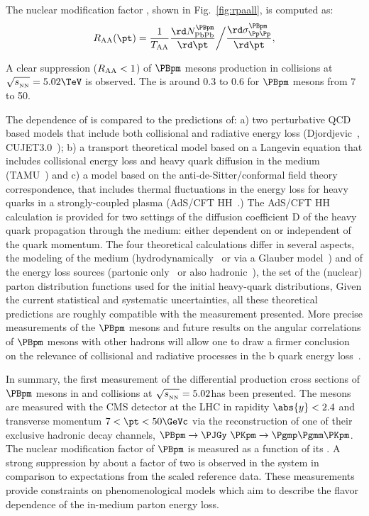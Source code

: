 The nuclear modification factor \RAA, shown in Fig.~\ref{fig:rpaall}, is computed as:
\begin{equation}
  \RAA (\pt) = \frac{1}{\TAA} \frac{{\rd}N^{\PBpm}_\PbPb}{{\rd}\pt} \bigg/ \frac{{\rd}\sigma^{\PBpm}_{\pp}}{{\rd}\pt},
  \label{eq:RAA}
\end{equation}

A clear suppression ($R_{\mathrm{AA}}<1$) of $\PBpm$ mesons production in \PbPb collisions at $\sqrtsNN=5.02\TeV$ is observed. The \RAA is around 0.3 to 0.6 for $\PBpm$ mesons \pt from 7 to 50\GeVc.

The \pt dependence of \RAA is compared to the predictions of: a) two perturbative QCD based models that include both collisional and radiative energy loss (Djordjevic~\cite{Djordjevic:2016vfo}, CUJET3.0~\cite{Xu:2015bbz, Xu:2014tda, Xu:2014ica}); b) a transport theoretical model based on a Langevin equation that includes collisional energy loss and heavy quark diffusion in the medium (TAMU~\cite{He:2011qa, He:2014cla}) and c) a model based on the anti-de-Sitter/conformal field theory correspondence, that includes thermal fluctuations in the energy loss for heavy quarks in a strongly-coupled plasma (AdS/CFT HH~\cite{Horowitz:2015dta, AdscftHH}.) The AdS/CFT HH calculation is provided for two settings of the diffusion coefficient D of the heavy quark propagation through the medium: either dependent on or independent of the quark momentum. The four theoretical calculations differ in several aspects, \eg the modeling of the \PbPb medium (hydrodynamically~\cite{Xu:2015bbz, He:2014cla} or via a Glauber model~\cite{Djordjevic:2016vfo}) and of the energy loss sources (partonic only~\cite{Xu:2015bbz, He:2014cla} or also hadronic~\cite{He:2014cla}), the set of the (nuclear) parton distribution functions used for the initial heavy-quark \pt distributions, \etc Given the current statistical and systematic uncertainties, all these theoretical predictions are roughly compatible with the measurement presented. More precise measurements of the $\PBpm$ mesons \RAA and future results on the angular correlations of $\PBpm$ mesons with other hadrons will allow one to draw a firmer conclusion on the relevance of collisional and radiative processes in the b quark energy loss~\cite{Rohrmoser:2016yct,Cao:2014dja}.

In summary, the first measurement of the differential production cross sections of $\PBpm$ mesons in \pp and \PbPb collisions at $\sqrtsNN=5.02$\TeV has been presented. The mesons are measured with the CMS detector at the LHC in rapidity $\abs{y}<2.4$ and transverse momentum $7<\pt<50\GeVc$ via the reconstruction of one of their exclusive hadronic decay channels, $\Bplusminusdecay$. The nuclear modification factor of $\PBpm$ is measured as a function of its \pt. A strong suppression by about a factor of two is observed in the \PbPb system in comparison to expectations from the scaled \pp reference data. These measurements provide constraints on phenomenological models which aim to describe the flavor dependence of the in-medium parton energy loss.

